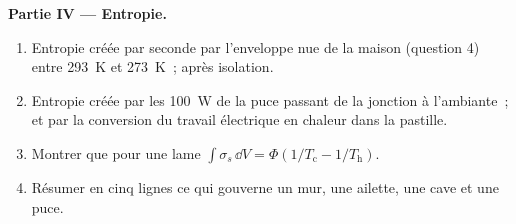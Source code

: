 \begin{problem}
\textbf{Partie IV --- Entropie.}
\begin{enumerate}[resume]
  \item Entropie créée par seconde par l'enveloppe nue de la maison
        (question 4) entre \qty{293}{K} et \qty{273}{K}~; après
        isolation.
  \item Entropie créée par les \qty{100}{W} de la puce passant de la
        jonction à l'ambiante~; et par la conversion du travail électrique
        en chaleur dans la pastille.
  \item Montrer que pour une lame $\int\sigma_s\,\dd V = \Phi(1/T_{\text{c}} -
        1/T_{\text{h}})$.
  \item Résumer en cinq lignes ce qui gouverne un mur, une ailette, une cave
        et une puce.
\end{enumerate}
\end{problem}
